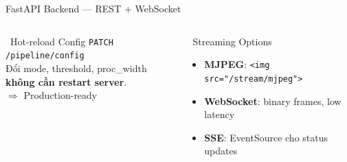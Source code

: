\documentclass[aspectratio=169, 12pt]{beamer}
\begin{document}
\begin{frame}{FastAPI Backend --- REST + WebSocket}
\begin{columns}[T]
\begin{block}{\faBolt\ Hot-reload Config}
\footnotesize
\texttt{PATCH /pipeline/config}\\
Đổi mode, threshold, proc\_width\\
\textbf{không cần restart server}.\\
$\Rightarrow$ Production-ready
\end{block}

\begin{alertblock}{\faRss\ Streaming Options}
\footnotesize
\begin{itemize}
  \item \textbf{MJPEG}: \texttt{<img src="/stream/mjpeg">}
  \item \textbf{WebSocket}: binary frames, low latency
  \item \textbf{SSE}: EventSource cho status updates
\end{itemize}
\end{alertblock}
\end{columns}
\end{frame}
\end{document}
